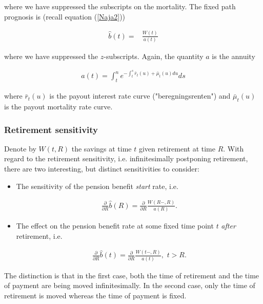 \documentclass{article}
\newcommand{\1}[1]{\mathbbm{1}_{\left\lbrace #1 \right\rbrace}}
\theoremstyle{break}
\theoremstyle{remark}
\numberwithin{equation}{section}
\begin{document}
where we have suppressed the subscripts on the mortality. The fixed path prognosis is (recall equation (\ref{Naja2}))

\begin{align*}
	\hat{b}(t) =& \frac{W(t)}{a(t)}
\end{align*}

where we have suppressed the $z$-subscripts. Again, the quantity $a$ is the annuity

\begin{align*}
	a(t) = \int_t^n e^{-\int_t^s \bar{r}_t(u) + \bar{\mu}_t(u) du} ds
\end{align*}

where $\bar{r}_t(u)$ is the payout interest rate curve ("beregningsrenten") and $\bar{\mu}_t(u)$ is the payout mortality rate curve.

\subsubsection{Retirement sensitivity}

Denote by $W(t,R)$ the savings at time $t$ given retirement at time $R$. With regard to the retirement sensitivity, i.e. infinitesimally postponing retirement, there are two interesting, but distinct sensitivities to consider:

\begin{itemize}
	\item The sensitivity of the pension benefit \textit{start} rate, i.e.
	
	\begin{align} \label{StartPens}
		\frac{\partial}{\partial R} \hat{b}(R) = \frac{\partial}{\partial R} \frac{W(R-,R)}{a(R)}.
	\end{align}

	\item The effect on the pension benefit rate at some fixed time point $t$ \textit{after} retirement, i.e.
	
	\begin{align} \label{LaterPens}
		\frac{\partial}{\partial R} \hat{b}(t) = \frac{\partial}{\partial R} \frac{W(t-,R)}{a(t)}, \, \, t > R.
	\end{align}
	
\end{itemize}

The distinction is that in the first case, both the time of retirement and the time of payment are being moved infinitesimally. In the second case, only the time of retirement is moved whereas the time of payment is fixed.
\end{document}
